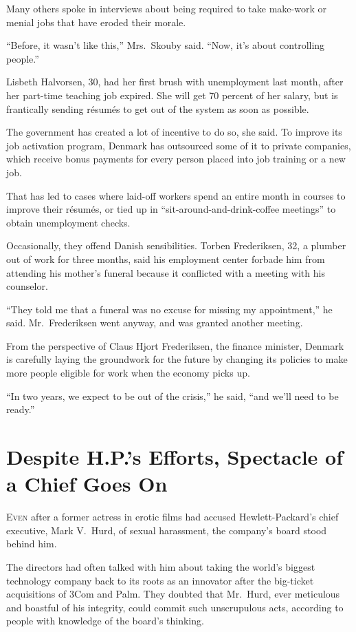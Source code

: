 ﻿\documentclass[12pt]{article}
\begin{document}
Many others spoke in interviews about being required to take make-work or menial jobs that have
eroded their morale.

``Before, it wasn't like this,'' Mrs.~Skouby said. ``Now, it's about controlling people.''

Lisbeth Halvorsen, 30, had her first brush with unemployment last month, after her part-time
teaching job expired. She will get 70 percent of her salary, but is frantically sending r\'esum\'es
to get out of the system as soon as possible.

The government has created a lot of incentive to do so, she said. To improve its job activation
program, Denmark has outsourced some of it to private companies, which receive bonus payments for
every person placed into job training or a new job.

That has led to cases where laid-off workers spend an entire month in courses to improve their
r\'esum\'es, or tied up in ``sit-around-and-drink-coffee meetings'' to obtain unemployment checks.

Occasionally, they offend Danish sensibilities. Torben Frederiksen, 32, a plumber out of work for
three months, said his employment center forbade him from attending his mother's funeral because it
conflicted with a meeting with his counselor.

``They told me that a funeral was no excuse for missing my appointment,'' he said. Mr.~Frederiksen
went anyway, and was granted another meeting.

From the perspective of Claus Hjort Frederiksen, the finance minister, Denmark is carefully laying
the groundwork for the future by changing its policies to make more people eligible for work when
the economy picks up.

``In two years, we expect to be out of the crisis,'' he said, ``and we'll need to be ready.''

\section{Despite H.P.'s Efforts, Spectacle of a Chief Goes On}

\lettrine{E}{ven} after a former actress in erotic films had accused
Hewlett-Packard's chief executive, Mark V.~Hurd, of sexual harassment, the company's board stood
behind him.

The directors had often talked with him about taking the world's biggest technology company back to
its roots as an innovator after the big-ticket acquisitions of 3Com and Palm. They doubted that
Mr.~Hurd, ever meticulous and boastful of his integrity, could commit such unscrupulous acts,
according to people with knowledge of the board's thinking.
\end{document}
